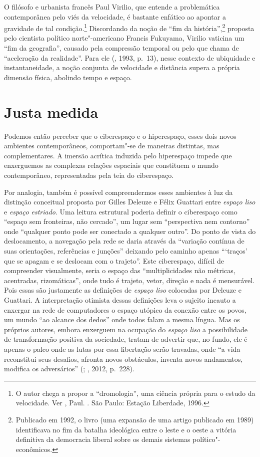 O filósofo e urbanista francês Paul Virilio, que entende a problemática
contemporânea pelo viés da velocidade, é bastante enfático ao apontar a
gravidade de tal condição.\footnote{O autor chega a propor a
  ``dromologia'', uma ciência própria para o estudo da velocidade. Ver
  , Paul. {}. São Paulo: Estação
  Liberdade, 1996.} Discordando da noção de ``fim da
história'',\footnote{Publicado em 1992, o livro {} (uma expansão de uma artigo publicado em 1989)
  identificava no fim da batalha ideológica entre o leste e o oeste a
  vitória definitiva da democracia liberal sobre os demais sistemas
  político"-econômicos.} proposta pelo cientista político norte"-americano
Francis Fukuyama, Virilio vaticina um ``fim da geografia'', causado pela
compressão temporal ou pelo que chama de ``aceleração da realidade''.
Para ele (, 1993, p.~13), nesse contexto de ubiquidade e
instantaneidade, a noção conjunta de velocidade e distância supera a
própria dimensão física, abolindo tempo e espaço.

\chapter{Justa medida}

Podemos então perceber que o ciberespaço e o hiperespaço, esses dois
novos ambientes contemporâneos, comportam"-se de maneiras distintas, mas
complementares. A imersão acrítica induzida pelo hiperespaço impede que
enxerguemos as complexas relações espaciais que constituem o mundo
contemporâneo, representadas pela teia do ciberespaço.

Por analogia, também é possível compreendermos esses ambientes à luz da
distinção conceitual proposta por Gilles Deleuze e Félix Guattari entre
\emph{espaço liso} e \emph{espaço estriado}. Uma leitura
estrutural poderia definir o ciberespaço como ``espaço sem fronteiras,
não cercado'', um lugar sem ``perspectiva nem contorno'' onde ``qualquer
ponto pode ser conectado a qualquer outro''. Do ponto de vista do
deslocamento, a navegação pela rede se daria através da ``variação
contínua de suas orientações, referências e junções'' deixando pelo
caminho apenas ```traços' que se apagam e se deslocam com o trajeto''.
Este ciberespaço, difícil de compreender visualmente, seria o espaço das
``multiplicidades não métricas, acentradas, rizomáticas'', onde tudo é
trajeto, vetor, direção e nada é mensurável. Pois essas são justamente
as definições de \emph{espaço liso} colocadas por Deleuze e Guattari. A
interpretação otimista dessas definições leva o sujeito incauto a
enxergar na rede de computadores o espaço utópico da conexão entre os
povos, um mundo ``ao alcance dos dedos'' onde todos falam a mesma
língua. Mas os próprios autores, embora enxerguem na ocupação do
\emph{espaço liso} a possibilidade de transformação positiva da
sociedade, tratam de advertir que, no fundo, ele é apenas o palco onde
as lutas por essa libertação serão travadas, onde ``a vida reconstitui
seus desafios, afronta novos obstáculos, inventa novos andamentos,
modifica os adversários'' (; , 2012, p.~228).

